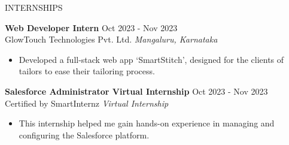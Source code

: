 \documentclass{resume} %
\begin{document}
\begin{rSection}{INTERNSHIPS}

 \textbf{Web Developer Intern} \hfill Oct 2023 - Nov 2023\\
GlowTouch Technologies Pvt. Ltd. \hfill \textit{Mangaluru, Karnataka}
 \begin{itemize}
    \itemsep -3pt {} 
    \item Developed a full-stack web app `SmartStitch', designed for the clients of tailors to ease their tailoring process. 
 \end{itemize}

 \textbf{Salesforce Administrator Virtual Internship} \hfill Oct 2023 - Nov 2023\\
Certified by SmartInternz \hfill \textit{Virtual Internship}
 \begin{itemize}
    \itemsep -3pt {} 
    \item This internship helped me gain hands-on experience in managing and configuring the Salesforce platform.
    \end{itemize}
    
\end{rSection} 
\end{document}
